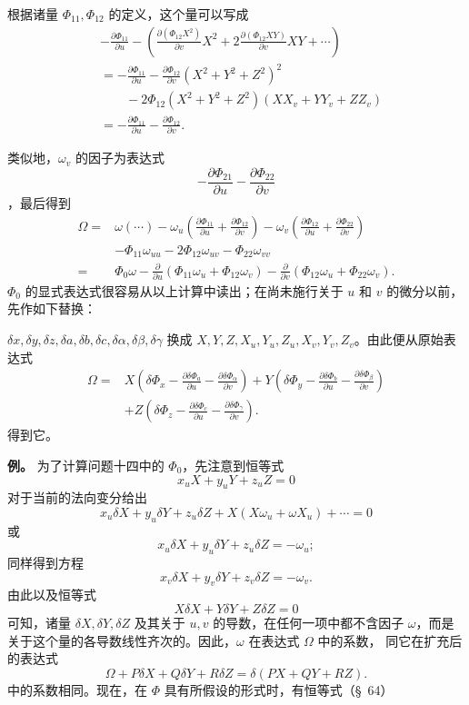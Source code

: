 \documentclass[11pt,a4paper,leqno]{article}
\begin{document}
根据诸量 $\Phi_{11},\Phi_{12}$ 的定义，这个量可以写成
\[
\begin{aligned}
&-\frac{\partial\Phi_{11}}{\partial u}
-\left(\frac{\partial(\Phi_{12}X^2)}{\partial v}X^2
+2\frac{\partial(\Phi_{12}XY)}{\partial v}XY+\cdots\right)\\
&=-\frac{\partial\Phi_{11}}{\partial u}
-\frac{\partial\Phi_{12}}{\partial v}(X^2+Y^2+Z^2)^2\\
&\qquad-2\Phi_{12}(X^2+Y^2+Z^2)(XX_v+YY_v+ZZ_v)\\
&=-\frac{\partial\Phi_{11}}{\partial u}
-\frac{\partial\Phi_{12}}{\partial v}.
\end{aligned}
\]

类似地，$\omega_v$ 的因子为表达式
\[
-\frac{\partial\Phi_{21}}{\partial u}
-\frac{\partial\Phi_{22}}{\partial v}
\]
，最后得到
\begin{equation}\tag{29}
\begin{aligned}
\Omega={}&\omega(\cdots)
-\omega_u\left(\frac{\partial\Phi_{11}}{\partial u}
+\frac{\partial\Phi_{12}}{\partial v}\right)
-\omega_v\left(\frac{\partial\Phi_{12}}{\partial u}
+\frac{\partial\Phi_{22}}{\partial v}\right)\\
&-\Phi_{11}\omega_{uu}-2\Phi_{12}\omega_{uv}-\Phi_{22}\omega_{vv}\\
={}&\Phi_0\omega
-\frac{\partial}{\partial u}(\Phi_{11}\omega_u+\Phi_{12}\omega_v)
-\frac{\partial}{\partial v}(\Phi_{12}\omega_u+\Phi_{22}\omega_v).
\end{aligned}
\end{equation}
$\Phi_0$ 的显式表达式很容易从以上计算中读出；在尚未施行关于 $u$ 和 $v$ 的微分以前，
先作如下替换：

\noindent
$\delta x,\delta y,\delta z,\delta a,\delta b,\delta c,\delta\alpha,\delta\beta,\delta\gamma$
换成 $X,Y,Z,X_u,Y_u,Z_u,X_v,Y_v,Z_v$。由此便从原始表达式
\[
\begin{aligned}
\Omega={}&X\left(\delta\Phi_x
-\frac{\partial\delta\Phi_a}{\partial u}
-\frac{\partial\delta\Phi_\alpha}{\partial v}\right)
+Y\left(\delta\Phi_y
-\frac{\partial\delta\Phi_b}{\partial u}
-\frac{\partial\delta\Phi_\beta}{\partial v}\right)\\
&+Z\left(\delta\Phi_z
-\frac{\partial\delta\Phi_c}{\partial u}
-\frac{\partial\delta\Phi_\gamma}{\partial v}\right).
\end{aligned}
\]
得到它。

\textbf{例。} 为了计算问题十四中的 $\Phi_0$，先注意到恒等式
\[
x_uX+y_uY+z_uZ=0
\]
对于当前的法向变分给出
\[
x_u\delta X+y_u\delta Y+z_u\delta Z
+X(X\omega_u+\omega X_u)+\cdots=0
\]
或
\[
x_u\delta X+y_u\delta Y+z_u\delta Z=-\omega_u;
\]
同样得到方程
\[
x_v\delta X+y_v\delta Y+z_v\delta Z=-\omega_v.
\]
由此以及恒等式
\[
X\delta X+Y\delta Y+Z\delta Z=0
\]
可知，诸量 $\delta X,\delta Y,\delta Z$ 及其关于 $u,v$ 的导数，在任何一项中都不含因子
$\omega$，而是关于这个量的各导数线性齐次的。因此，$\omega$ 在表达式 $\Omega$ 中的系数，
同它在扩充后的表达式
\begin{equation}\tag{30}
\Omega+P\delta X+Q\delta Y+R\delta Z=\delta(PX+QY+RZ).
\end{equation}
中的系数相同。现在，在 $\Phi$ 具有所假设的形式时，有恒等式（\S~64）
\end{document}
